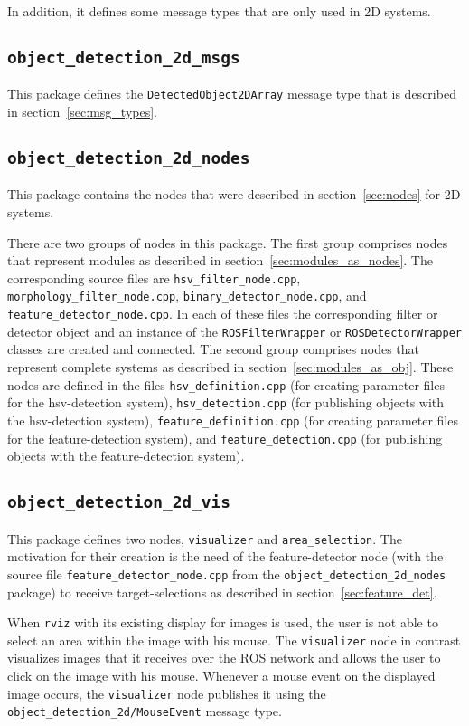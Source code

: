 \documentclass{article}
\newcommand{\code}[1]{\texttt{#1}}
\begin{document}
In addition, it defines some message types that are only used
in 2D systems.

\subsection{\code{object\_detection\_2d\_msgs}}
This package defines the \code{DetectedObject2DArray} message
type that is described in section~\ref{sec:msg_types}.

\subsection{\code{object\_detection\_2d\_nodes}}
This package contains the nodes that were described in section~\ref{sec:nodes}
for 2D systems.

There are two groups of nodes in this package.
The first group comprises nodes that represent modules as described in
section~\ref{sec:modules_as_nodes}. The corresponding
source files are \code{hsv\_filter\_node.cpp}, \code{morphology\_filter\_node.cpp},
\code{binary\_detector\_node.cpp}, and \code{feature\_detector\_node.cpp}.
In each of these files the corresponding filter or detector object and an
instance of the \code{ROSFilterWrapper} or \code{ROSDetectorWrapper} classes are
created and connected.
The second group comprises nodes that represent complete systems as described in
section~\ref{sec:modules_as_obj}. These nodes are defined in the files
\code{hsv\_definition.cpp} (for creating parameter files for the hsv-detection
system), \code{hsv\_detection.cpp} (for publishing objects with the hsv-detection
system), \code{feature\_definition.cpp} (for creating parameter files for
the feature-detection system), and \code{feature\_detection.cpp} (for publishing
objects with the feature-detection system).



\subsection{\code{object\_detection\_2d\_vis}}
This package defines two nodes, \code{visualizer} and \code{area\_selection}.
The motivation for their creation is the need of the feature-detector node
(with the source file \code{feature\_detector\_node.cpp} from the
\code{object\_detection\_2d\_nodes} package)
to receive target-selections as described in section~\ref{sec:feature_det}.

When \code{rviz} with its existing display for images is used, the user is
not able to select an area within the image with his mouse.
The \code{visualizer} node in contrast visualizes images that it receives
over the ROS network and allows the user to click on the image with his mouse.
Whenever a mouse event on the displayed image occurs, the \code{visualizer}
node publishes it using the \code{object\_detection\_2d/MouseEvent} message
type.
\end{document}
